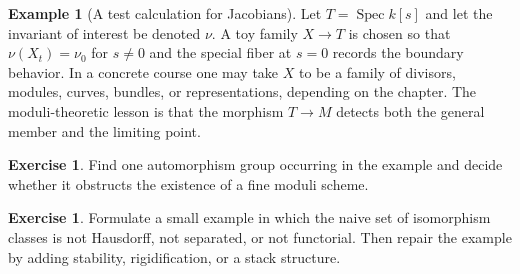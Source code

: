 \documentclass[11pt]{amsart}
\theoremstyle{definition}
\newtheorem{example}[theorem]{Example}
\newtheorem{exercise}[theorem]{Exercise}
\newcommand{\Spec}{\operatorname{Spec}}
\begin{document}
\begin{example}[A test calculation for Jacobians]
Let $T=\Spec k[s]$ and let the invariant of interest be denoted $\nu$.  A toy family $X\to T$ is chosen so that $\nu(X_t)=\nu_0$ for $s\ne0$ and the special fiber at $s=0$ records the boundary behavior.  In a concrete course one may take $X$ to be a family of divisors, modules, curves, bundles, or representations, depending on the chapter.  The moduli-theoretic lesson is that the morphism $T\to M$ detects both the general member and the limiting point.
\end{example}
\begin{exercise}
Find one automorphism group occurring in the example and decide whether it obstructs the existence of a fine moduli scheme.
\end{exercise}
\begin{exercise}
Formulate a small example in which the naive set of isomorphism classes is not Hausdorff, not separated, or not functorial.  Then repair the example by adding stability, rigidification, or a stack structure.
\end{exercise}
\clearpage
\end{document}
